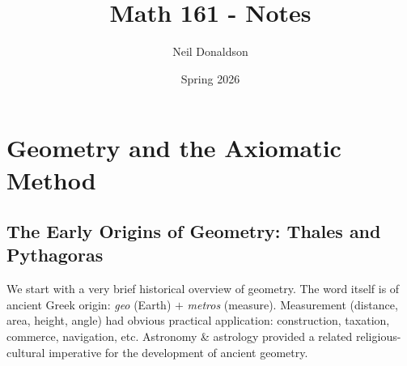 \thispagestyle{empty}
\graphicspath{{1axioms/asy/}}

\title{Math 161 - Notes}
\author{Neil Donaldson}
\date{Spring 2026}
\maketitle


\section{Geometry and the Axiomatic Method}\label{chap:axioms}

\subsection{The Early Origins of Geometry: Thales and Pythagoras}\label{sec:thales}


We start with a very brief historical overview of geometry. The word itself is of ancient Greek origin: \emph{geo} (Earth) $+$ \emph{metros} (measure). Measurement (distance, area, height, angle) had obvious practical application: construction, taxation, commerce, navigation, etc. Astronomy \& astrology provided a related religious-cultural imperative for the development of ancient geometry.

